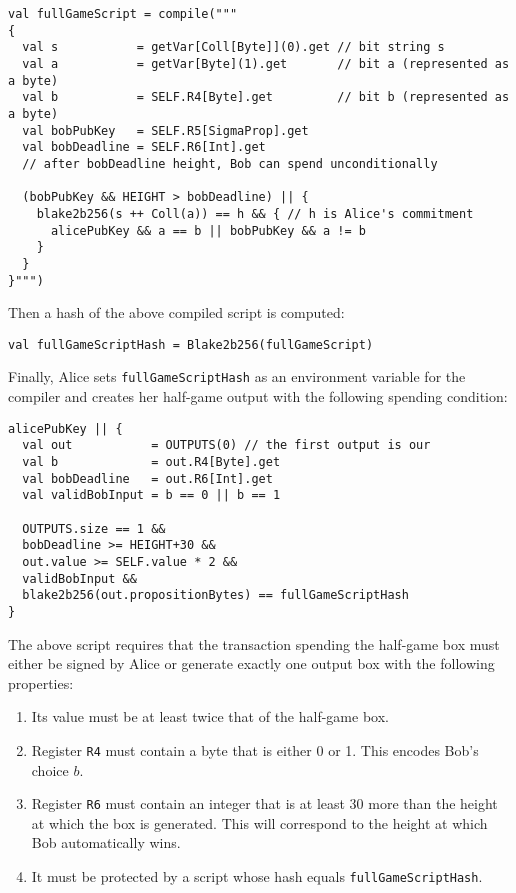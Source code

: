 \documentclass[11pt]{article}
\begin{document}
\begin{verbatim}
val fullGameScript = compile("""
{
  val s           = getVar[Coll[Byte]](0).get // bit string s 
  val a           = getVar[Byte](1).get       // bit a (represented as a byte)
  val b           = SELF.R4[Byte].get         // bit b (represented as a byte)
  val bobPubKey   = SELF.R5[SigmaProp].get
  val bobDeadline = SELF.R6[Int].get 
  // after bobDeadline height, Bob can spend unconditionally

  (bobPubKey && HEIGHT > bobDeadline) || {
    blake2b256(s ++ Coll(a)) == h && { // h is Alice's commitment
      alicePubKey && a == b || bobPubKey && a != b
    }
  }
}""")
\end{verbatim}

Then a hash of the above compiled script is computed:

\begin{verbatim}
val fullGameScriptHash = Blake2b256(fullGameScript)
\end{verbatim}

Finally, Alice sets \texttt{fullGameScriptHash} as an environment variable for the compiler and creates her half-game output with the following spending condition:

\begin{verbatim}
alicePubKey || {
  val out           = OUTPUTS(0) // the first output is our 
  val b             = out.R4[Byte].get
  val bobDeadline   = out.R6[Int].get
  val validBobInput = b == 0 || b == 1

  OUTPUTS.size == 1 &&
  bobDeadline >= HEIGHT+30 &&
  out.value >= SELF.value * 2 &&
  validBobInput &&
  blake2b256(out.propositionBytes) == fullGameScriptHash
}
\end{verbatim}

The above script requires that the transaction spending the half-game box must either be signed by Alice or generate exactly one output box with the following properties:

\begin{enumerate}
	\item Its value must be at least twice that of the half-game box.
	\item Register \texttt{R4} must contain a byte that is either 0 or 1. This encodes Bob's choice $b$.
	\item Register \texttt{R6} must contain an integer that is at least 30 more than the height at which the box is generated. This will correspond to the height at which Bob automatically wins.
	\item It must be protected by a script whose hash equals \texttt{fullGameScriptHash}.
\end{enumerate}
 
\end{document}

